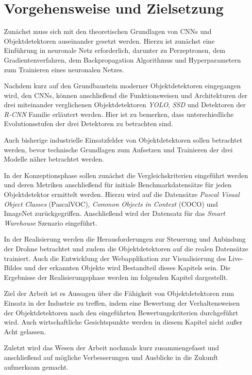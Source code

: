 \section{Vorgehensweise und Zielsetzung}

Zunächst muss sich mit den theoretischen Grundlagen von CNNs und Objektdetektoren auseinander gesetzt werden. Hierzu ist zunächst eine Einführung in neuronale Netz erforderlich, darunter zu Perzeptronen, dem Gradientenverfahren, dem Backpropagation Algorithmus und Hyperparametern zum Trainieren eines neuronalen Netzes. 

Nachdem kurz auf den Grundbaustein moderner Objektdetektoren eingegangen wird, den CNNs, können anschließend die Funktionsweisen und Architekturen der drei miteinander verglichenen Objektdetektoren \textit{YOLO}, \textit{SSD} und Detektoren der \textit{R-CNN} Familie erläutert werden. Hier ist zu bemerken, dass unterschiedliche Evolutionsstufen der drei Detektoren zu betrachten sind. 

Auch bisherige industrielle Einsatzfelder von Objektdetektoren sollen betrachtet werden, bevor technische Grundlagen zum Aufsetzen und Trainieren der drei Modelle näher betrachtet werden. 

In der Konzeptionsphase sollen zunächst die Vergleichskriterien eingeführt werden und deren Metriken anschließend für initiale Benchmarkdatensätze für jeden Objektdetektor ermittelt werden. Hierzu wird auf die Datensätze \textit{Pascal Visual Object Classes} (PascalVOC), \textit{Common Objects in Context} (COCO) und ImageNet zurückgegriffen. Anschließend wird der Datensatz für das \textit{Smart Warehouse} Szenario eingeführt. 

In der Realisierung werden die Herausforderungen zur Steuerung und Anbindung der Drohne betrachtet und zudem die Objektdetektoren auf die realen Datensätze trainiert. Auch die Entwicklung der Webapplikation zur Visualisierung des Live-Bildes und der erkannten Objekte wird Bestandteil dieses Kapitels sein. Die Ergebnisse der Realisierungsphase werden im folgenden Kapitel dargestellt. 

Ziel der Arbeit ist es Aussagen über die Fähigkeit von Objektdetektoren zum Einsatz in der Industrie zu treffen, indem eine Bewertung der Verhaltensweisen der Objektdetektoren nach den eingeführten Bewertungskriterien durchgeführt wird. Auch wirtschaftliche Gesichtspunkte werden in diesem Kapitel nicht außer Acht gelassen. 

Zuletzt wird das Wesen der Arbeit nochmals kurz zusammengefasst und anschließend auf mögliche Verbesserungen und Ausblicke in die Zukunft aufmerksam gemacht. 
